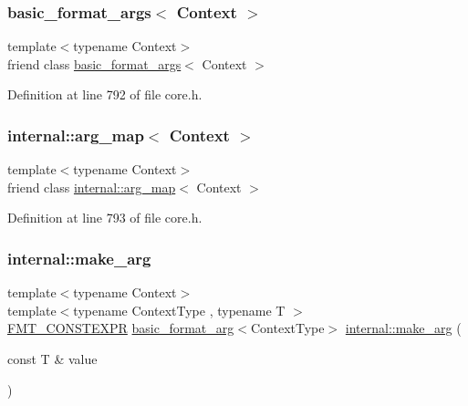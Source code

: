 \subsubsection{\texorpdfstring{basic\+\_\+format\+\_\+args$<$ Context $>$}{basic\_format\_args< Context >}}
{\footnotesize\ttfamily template$<$typename Context$>$ \\
friend class \hyperlink{classbasic__format__args}{basic\+\_\+format\+\_\+args}$<$ Context $>$\hspace{0.3cm}{\ttfamily [friend]}}



Definition at line 792 of file core.\+h.

\mbox{\label{classbasic__format__arg_a7974100f026be256213827458684be38}} 
\subsubsection{\texorpdfstring{internal\+::arg\+\_\+map$<$ Context $>$}{internal::arg\_map< Context >}}
{\footnotesize\ttfamily template$<$typename Context$>$ \\
friend class \hyperlink{classinternal_1_1arg__map}{internal\+::arg\+\_\+map}$<$ Context $>$\hspace{0.3cm}{\ttfamily [friend]}}



Definition at line 793 of file core.\+h.

\mbox{\label{classbasic__format__arg_ae7aafc9e488aab46969a5eae2da3d96b}} 
\subsubsection{\texorpdfstring{internal\+::make\+\_\+arg}{internal::make\_arg}}
{\footnotesize\ttfamily template$<$typename Context$>$ \\
template$<$typename Context\+Type , typename T $>$ \\
\hyperlink{core_8h_a69201cb276383873487bf68b4ef8b4cd}{F\+M\+T\+\_\+\+C\+O\+N\+S\+T\+E\+X\+PR} \hyperlink{classbasic__format__arg}{basic\+\_\+format\+\_\+arg}$<$Context\+Type$>$ \hyperlink{namespaceinternal_ac3d17a309d86929584064104267b6de4}{internal\+::make\+\_\+arg} (\begin{DoxyParamCaption}\item[{const T \&}]{value }\end{DoxyParamCaption})\hspace{0.3cm}{\ttfamily [friend]}}

